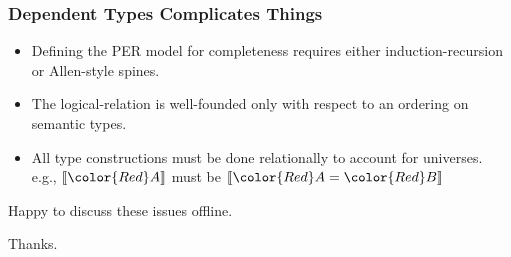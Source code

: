 \documentclass[svgnames]{beamer}
\newcommand\fmtval[1]{{\color{Red}#1}}
\newcommand{\sem}[1]{\llbracket #1 \rrbracket}
\begin{document}
\begin{frame}
  \frametitle{Dependent Types Complicates Things}
  \begin{itemize}
  \item Defining the PER model for completeness requires either induction-recursion or Allen-style
    spines.
  \item The logical-relation is well-founded only with respect to an ordering on \fmtval{semantic
      types}.
  \item All type constructions must be done relationally to account for universes.\\
    e.g., $\sem{\fmtval{A}}$ must be $\sem{\fmtval{A} = \fmtval{B}}$
  \end{itemize}
  \pause

  Happy to discuss these issues offline.
  \pause

  Thanks.
\end{frame}
\end{document}
